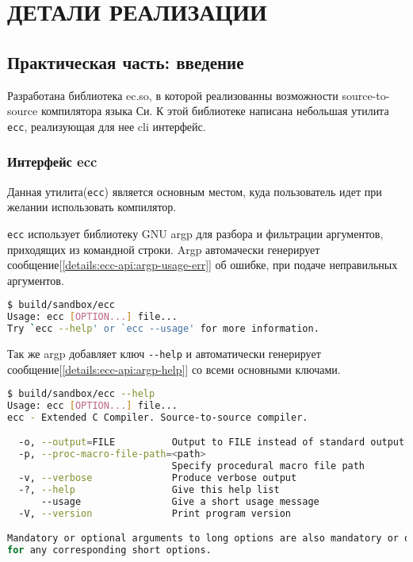 \chapter{ДЕТАЛИ РЕАЛИЗАЦИИ}
\label{ch:ch2}

\section{Практическая часть: введение}

Разработана библиотека ec.so, в которой реализованны возможности source-to-source компилятора языка Си.
К этой библиотеке написана небольшая утилита \verb|ecc|, реализующая для нее cli интерфейс.

\subsection*{Интерфейс ecc}
Данная утилита(\verb|ecc|) является основным местом, куда пользователь идет при желании использовать компилятор.

\verb|ecc| использует библиотеку GNU argp для разбора и фильтрации аргументов, приходящих из командной строки. 
Argp автомачески генерирует сообщение[\ref{details:ecc-api:argp-usage-err}] об ошибке, при подаче неправильных аргументов.

\begin{lstlisting}[language=bash, caption={Пример сообщения об ошике, сгенерированного argp}, label={details:ecc-api:argp-usage-err}]
$ build/sandbox/ecc                                   
Usage: ecc [OPTION...] file...
Try `ecc --help' or `ecc --usage' for more information.
\end{lstlisting}

Так же argp добавляет ключ \verb|--help| и автоматически генерирует сообщение[\ref{details:ecc-api:argp-help}] со всеми основными ключами.
\begin{lstlisting}[language=bash, caption={Пример сообщения об использовании, сгенерированного argp}, label={details:ecc-api:argp-help}]
$ build/sandbox/ecc --help
Usage: ecc [OPTION...] file...
ecc - Extended C Compiler. Source-to-source compiler.

  -o, --output=FILE          Output to FILE instead of standard output
  -p, --proc-macro-file-path=<path>
                             Specify procedural macro file path
  -v, --verbose              Produce verbose output
  -?, --help                 Give this help list
      --usage                Give a short usage message
  -V, --version              Print program version

Mandatory or optional arguments to long options are also mandatory or optional
for any corresponding short options.
\end{lstlisting}

